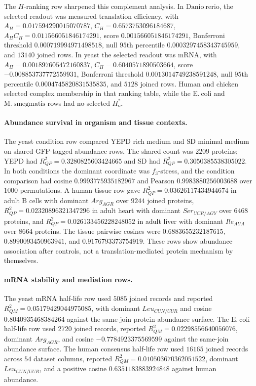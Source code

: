 The $H$-ranking row sharpened this complement analysis.  In $\mathrm{Danio\ rerio}$, the selected readout was measured translation efficiency, with $A_H=0.017594290015070787$, $C_H=0.6573753096184687$, $A_HC_H=0.011566051846174291$, score $0.001566051846174291$, Bonferroni threshold $0.000719994971498518$, null $95$th percentile $0.0003297458343745959$, and $13140$ joined rows.  In yeast the selected readout was mRNA, with $A_H=0.001897605472160837$, $C_H=0.6040571890503664$, score $-0.008853737772559931$, Bonferroni threshold $0.0013014749238591248$, null $95$th percentile $0.0004745820831535835$, and $5128$ joined rows.  Human and chicken selected complex membership in that ranking table, while the $\mathrm{E.\ coli}$ and $\mathrm{M.\ smegmatis}$ rows had no selected $H_o^*$.

\paragraph{Abundance survival in organism and tissue contexts.}
The yeast condition row compared YEPD rich medium and SD minimal medium on shared GFP-tagged abundance rows.  The shared count was $2209$ proteins; YEPD had $R^2_{QP}=0.3280825603424665$ and SD had $R^2_{QP}=0.3050385538305022$.  In both conditions the dominant coordinate was $f_3$-stress, and the condition comparison had cosine $0.9993775935182967$ and Pearson $0.9983880256003688$ over $1000$ permutations.  A human tissue row gave $R^2_{QP}=0.03626117434944674$ in adult B cells with dominant $Arg_{AGR}$ over $9244$ joined proteins, $R^2_{QP}=0.02320896321347296$ in adult heart with dominant $Ser_{UCR/AGY}$ over $6468$ proteins, and $R^2_{QP}=0.026133456228248052$ in adult liver with dominant $Ile_{AUA}$ over $8664$ proteins.  The tissue pairwise cosines were $0.6883655232187615$, $0.8990093450963941$, and $0.9176793373754919$.  These rows show abundance association after controls, not a translation-mediated protein mechanism by themselves.

\paragraph{mRNA stability and mediation rows.}
The yeast mRNA half-life row used $5085$ joined records and reported $R^2_{QM}=0.05179429044975085$, with dominant $Leu_{CUN/UUR}$ and cosine $0.8040935468384264$ against the same-join protein-abundance surface.  The $\mathrm{E.\ coli}$ half-life row used $2720$ joined records, reported $R^2_{QM}=0.02298556640056076$, dominant $Arg_{AGR}$, and cosine $-0.7784923375569599$ against the same-join abundance surface.  The human consensus half-life row used $16165$ joined records across $54$ dataset columns, reported $R^2_{QM}=0.010503670362051522$, dominant $Leu_{CUN/UUR}$, and a positive cosine $0.6351183883924848$ against human abundance.

